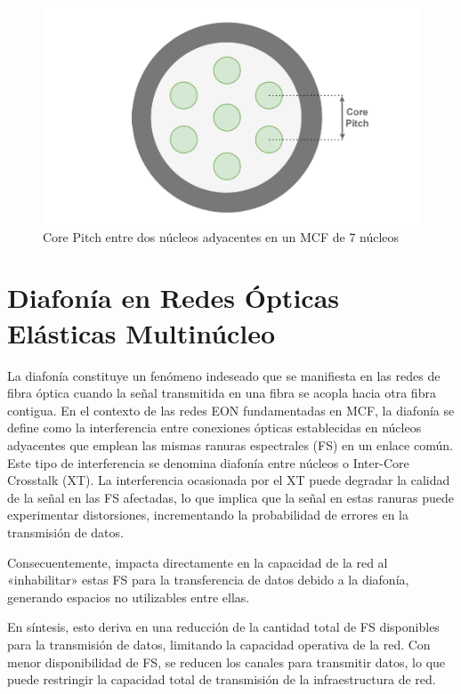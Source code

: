 \begin{figure}[H]
    \centering
    \includegraphics[width=1\textwidth]{capitulos/img/CORE_PITCH.png}
    \caption{Core Pitch entre dos núcleos adyacentes en un MCF de 7 núcleos}
    \label{fig:CORE_PITCH}
\end{figure}

\section{Diafonía en Redes Ópticas Elásticas Multinúcleo}
La diafonía constituye un fenómeno indeseado que se manifiesta en las redes de fibra óptica cuando la señal transmitida en una fibra se acopla hacia otra fibra contigua. En el contexto de las redes EON fundamentadas en MCF, la diafonía se define como la interferencia entre conexiones ópticas establecidas en núcleos adyacentes que emplean las mismas ranuras espectrales (FS) en un enlace común.
 Este tipo de interferencia se denomina diafonía entre núcleos o Inter-Core Crosstalk (XT). La interferencia ocasionada por el XT puede degradar la calidad de la señal en las FS afectadas, lo que implica que la señal en estas ranuras puede experimentar distorsiones, incrementando la probabilidad de errores en la transmisión de datos.
%
 
 Consecuentemente, impacta directamente en la capacidad de la red al «inhabilitar» estas FS para la transferencia de datos debido a la diafonía, generando espacios no utilizables entre ellas.
%

 En síntesis, esto deriva en una reducción de la cantidad total de FS disponibles para la transmisión de datos, limitando la capacidad operativa de la red. Con menor disponibilidad de FS, se reducen los canales para transmitir datos, lo que puede restringir la capacidad total de transmisión de la infraestructura de red.
%

